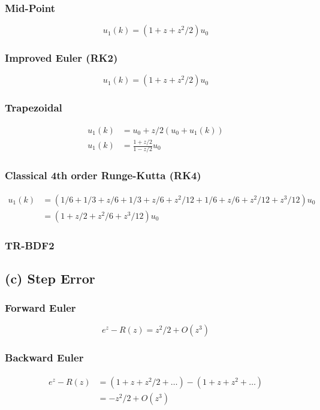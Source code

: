 \documentclass{article}
\begin{document}
\subsubsection*{Mid-Point}
\begin{equation}
u_1(k)=(1+z+z^2/2)u_0
\end{equation}

\subsubsection*{Improved Euler (RK2)}
\begin{equation}
u_1(k)=(1+z+z^2/2)u_0
\end{equation}

\subsubsection*{Trapezoidal}
\begin{align}
u_1(k)&=u_0+z/2(u_0+u_1(k)) \nonumber\\
u_1(k)&=\frac{1+z/2}{1-z/2}u_0
\end{align}

\subsubsection*{Classical 4th order Runge-Kutta (RK4)}
\begin{align}
u_1(k)&=(1/6+1/3+z/6+1/3+z/6+z^2/12+1/6+z/6+z^2/12+z^3/12)u_0 \nonumber\\
&=(1+z/2+z^2/6+z^3/12)u_0
\end{align}

\subsubsection*{TR-BDF2}

\subsection*{(c) Step Error}
\subsubsection*{Forward Euler}
\begin{equation}
e^z-R(z)=z^2/2+O(z^3)
\end{equation}

\subsubsection*{Backward Euler}
\begin{align}
e^z-R(z)&=(1+z+z^2/2+\dots)-(1+z+z^2+\dots) \nonumber\\
&=-z^2/2+O(z^3)
\end{align}
\end{document}
